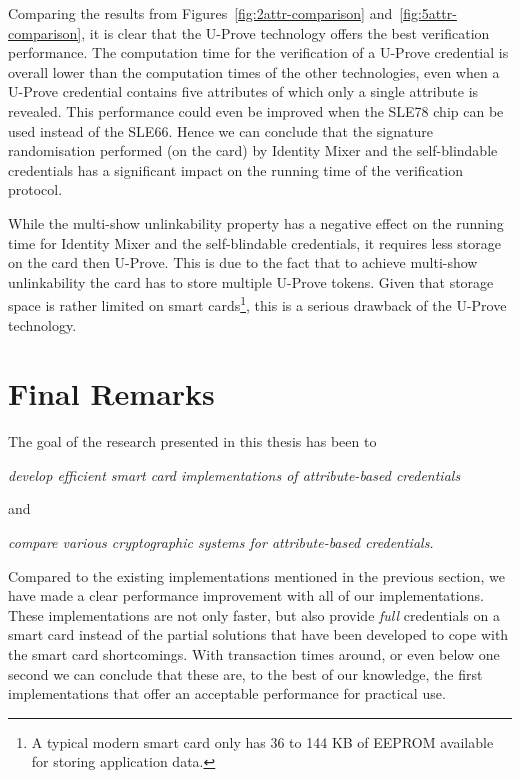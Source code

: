 Comparing the results from Figures~\ref{fig:2attr-comparison}
and~\ref{fig:5attr-comparison}, it is clear that the U-Prove technology offers
the best verification performance. The computation time for the verification of
a U-Prove credential is overall lower than the computation times of the other
technologies, even when a U-Prove credential contains five attributes of which
only a single attribute is revealed. This performance could even be improved
when the SLE78 chip can be used instead of the SLE66. Hence we can conclude that
the signature randomisation performed (on the card) by Identity Mixer and the self-blindable
credentials has a significant impact on the running time of the verification
protocol.

While the multi-show unlinkability property has a negative effect on the running
time for Identity Mixer and the self-blindable credentials, it requires less
storage on the card then U-Prove. This is due to the fact that to achieve
multi-show unlinkability the card has to store multiple U-Prove tokens. Given
that storage space is rather limited on smart cards\footnote{A typical modern smart
card only has 36 to 144 KB of EEPROM available for storing application data.},
this is a serious drawback of the U-Prove technology.

\section{Final Remarks}

The goal of the research presented in this thesis has been to
\begin{center}\it
  develop efficient smart card implementations of attribute-based credentials
\end{center}
and
\begin{center}\it
  compare various cryptographic systems for attribute-based credentials.
\end{center}

Compared to the existing implementations mentioned in the previous section, we
have made a clear performance improvement with all of our implementations. These
implementations are not only faster, but also provide \emph{full} credentials
on a smart card instead of the partial solutions that have been developed to
cope with the smart card shortcomings. With transaction times around, or even
below one second we can conclude that these are, to the best of our knowledge,
the first implementations that offer an acceptable performance for practical
use.

